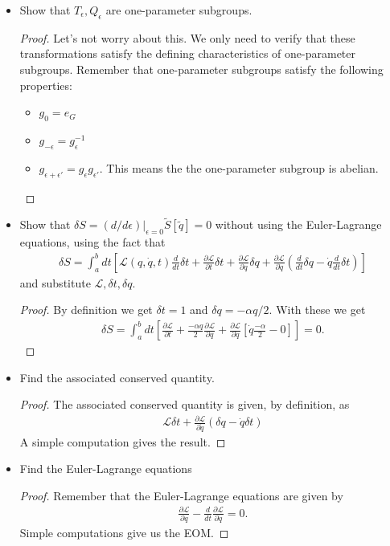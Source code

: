 \documentclass{book}
\theoremstyle{definition}
\newcommand{\p}{\partial}
\newcommand{\lag}{\mathcal{L}}
\newcommand{\al}{\alpha}
\newcommand{\ep}{\epsilon}
\newcommand{\f}[2]{\frac{#1}{#2}}
\newcommand{\td}[1]{\tilde{#1}}
\newcommand{\lp}{\left(}
\newcommand{\rp}{\right)}
\newcommand{\lb}{\left[}
\newcommand{\rb}{\right]}
\begin{document}
\begin{itemize}
	\item Show that $T_\ep, Q_\ep$ are one-parameter subgroups. 
	\begin{proof}
		Let's not worry about this. We only need to verify that these transformations satisfy the defining characteristics of one-parameter subgroups. Remember that one-parameter subgroups satisfy the following properties:
		\begin{itemize}
			\item $g_0 = e_G$
			\item $g_{-\epsilon} = g_\epsilon^{-1}$
			\item $g_{\epsilon + \epsilon'} = g_\epsilon g_{\epsilon'}$. This means the the one-parameter subgroup is abelian.
		\end{itemize}
	\end{proof}

	\item Show that $\delta S = (d/d\ep)\big\vert_{\ep=0}\td{S}[\td{q}] = 0$ without using the Euler-Lagrange equations, using the fact that
	\begin{align}
	\delta S = \int^b_a dt\lb \lag(q,\dot{q},t)\f{d}{dt}\delta t + \f{\p \lag}{\p t}\delta t + \f{\p \lag}{\p q}\delta q + \f{\p \lag}{\p \dot{q}}\lp \f{d}{dt}\delta q - \dot{q}\f{d}{dt}\delta t\rp \rb
	\end{align}
	and substitute $\lag, \delta t, \delta q$.
	\begin{proof}
	By definition we get $\delta t=  1$ and $\delta q = -\al q/2$. With these we get 
	\begin{align}
	\delta S = \int^b_a dt\lb \f{\p \lag}{\p t} + \f{-\al q}{2} \f{\p \lag}{\p q} + \f{\p \lag}{\p \dot{q}}\lb \dot{q}\f{-\al}{2} - 0 \rb \rb = 0.
	\end{align}
	\end{proof}

	\item Find the associated conserved quantity.
	\begin{proof}
	The associated conserved quantity is given, by definition, as
	\begin{align}
	\lag \delta t + \f{\p \lag}{\p \dot{q}}(\delta q - \dot{q}\delta t)
	\end{align}
	A simple computation gives the result. 
	\end{proof}

	\item Find the Euler-Lagrange equations
	\begin{proof}
	Remember that the Euler-Lagrange equations are given by
	\begin{align}
	\f{\p \lag}{\p q} - \f{d}{dt}\f{\p \lag}{\p \dot{q}} =0.
	\end{align}
	Simple computations give us the EOM.
	\end{proof}


\end{itemize}
\end{document}
